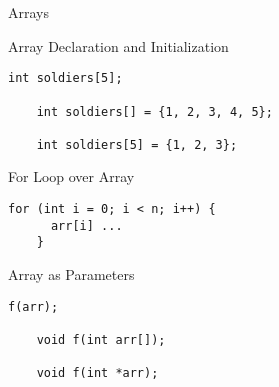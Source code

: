 \begin{frame}{}
  \centerline{\LARGE Arrays}
\end{frame}

\begin{frame}[fragile]{Array Declaration and Initialization}
  \begin{lstlisting}[style = Cstyle]
    int soldiers[5];

    int soldiers[] = {1, 2, 3, 4, 5};

    int soldiers[5] = {1, 2, 3};
  \end{lstlisting}
\end{frame}

\begin{frame}[fragile]{For Loop over Array}
  \begin{lstlisting}[style = Cstyle]
    for (int i = 0; i < n; i++) {
      arr[i] ...
    }
  \end{lstlisting}
\end{frame}

\begin{frame}[fragile]{Array as Parameters}
  \begin{lstlisting}[style = Cstyle]
    f(arr);

    void f(int arr[]);

    void f(int *arr);
  \end{lstlisting}
\end{frame}
